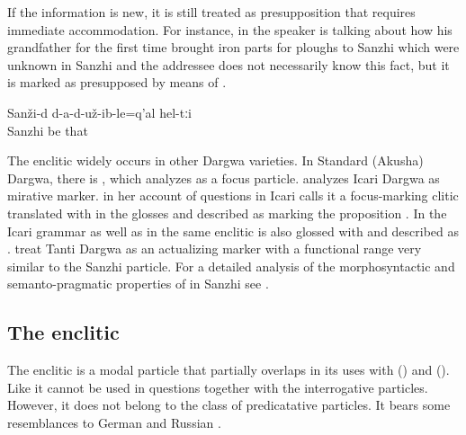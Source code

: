 If the information is new, it is still treated as presupposition that requires immediate accommodation. For instance, in  the speaker is talking about how his grandfather for the first time brought iron parts for ploughs to Sanzhi which were unknown in Sanzhi and the addressee does not necessarily know this fact, but it is marked as presupposed by means of .
%
\begin{exe}
	\ex	\label{ex:In Sanzhi, they did not have them (the iron item that you use on wooden ploughs) minor}
	\gll	Sanži-d	d-a-d-už-ib-le=q'al	hel-tːi\\
		Sanzhi	be	that\\
	\glt	{}
\end{exe}

The enclitic  widely occurs in other Dargwa varieties. In Standard (Akusha) Dargwa, there is , which \citet[748]{vandenBerg2001} analyzes as a focus particle. \citet{Tatevosov2001} analyzes Icari Dargwa  as mirative marker. \citet{Sumbatova2009} in her account of questions in Icari calls it a focus-marking clitic translated with  in the glosses and described as marking the proposition . In the Icari grammar as well as in \citet{Kalinina.Sumbatova2007} the same enclitic is also glossed with  and described as . \citet[338]{Sumbatova.Lander2014} treat Tanti Dargwa  as an actualizing marker with a functional range very similar to the Sanzhi particle. For a detailed analysis of the morphosyntactic and semanto-pragmatic properties of  in Sanzhi see \citet{ForkerSubmittedc}.



\subsection{The enclitic }
\label{ssec:The enclitic =q'ar}

The enclitic  is a modal particle that partially overlaps in its uses with  () and  (). Like  it cannot be used in questions together with the interrogative particles. However, it does not belong to the class of predicatative particles. It bears some resemblances to German  and Russian .

